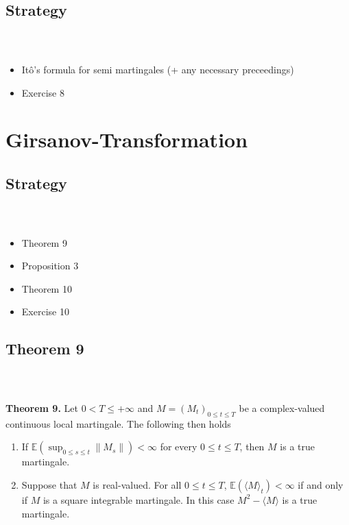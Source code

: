\documentclass{beamer}
\numberwithin{equation}{section}
\newenvironment{frame2}{\begin{frame}\frametitle{{\normalsize \secname} \\ {\large \subsecname}}}{\end{frame}}
\begin{document}
\subsection{Strategy}
\begin{frame2}
    \begin{itemize}
        \item Itô's formula for semi martingales (+ any necessary preceedings)
        \item Exercise 8
    \end{itemize}
\end{frame2}

\section{Girsanov-Transformation}

\subsection{Strategy}
\begin{frame2}
    \begin{itemize}
        \item Theorem 9
        \item Proposition 3
        \item Theorem 10
        \item Exercise 10
    \end{itemize}
\end{frame2}

\subsection{Theorem 9}

\begin{frame2}
    \textbf{Theorem 9.}
    Let $0 < T \leq +\infty$ and $M = (M_t)_{0\leq t \leq T}$ be a complex-valued continuous local martingale.
    The following then holds
    \begin{enumerate}
        \item If $\mathbb{E}(\sup_{0 \leq s \leq t} \| M_s \|) < \infty$ for every $ 0 \leq t \leq T$, then $M$ is a true martingale.
        \item Suppose that $M$ is real-valued.
        For all $0 \leq t \leq T$, $\mathbb{E}(\langle M \rangle_t) < \infty$ if and only if $M$ is a square integrable martingale.
        In this case $M^2 - \langle M \rangle$ is a true martingale.
    \end{enumerate}
\end{frame2}
\end{document}
